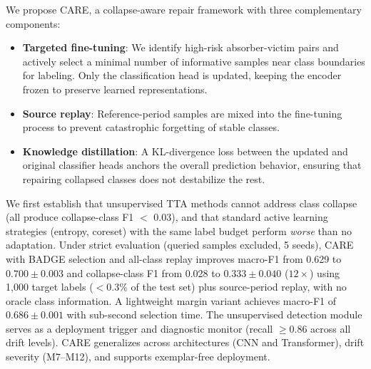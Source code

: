 \documentclass[journal]{IEEEtran}
\newcommand{\ours}{CARE}  %
\begin{document}
We propose \ours{}, a collapse-aware repair framework with three complementary components:
\begin{itemize}
  \item \textbf{Targeted fine-tuning}: We identify high-risk absorber-victim pairs and actively select a minimal number of informative samples near class boundaries for labeling. Only the classification head is updated, keeping the encoder frozen to preserve learned representations.
  \item \textbf{Source replay}: Reference-period samples are mixed into the fine-tuning process to prevent catastrophic forgetting of stable classes.
  \item \textbf{Knowledge distillation}: A KL-divergence loss between the updated and original classifier heads anchors the overall prediction behavior, ensuring that repairing collapsed classes does not destabilize the rest.
\end{itemize}

We first establish that unsupervised TTA methods cannot address class collapse (all produce collapse-class F1 $<$ 0.03), and that standard active learning strategies (entropy, coreset) with the same label budget perform \textit{worse} than no adaptation.
Under strict evaluation (queried samples excluded, 5 seeds), \ours{} with BADGE selection and all-class replay improves macro-F1 from 0.629 to $0.700{\pm}0.003$ and collapse-class F1 from 0.028 to $0.333{\pm}0.040$ ($12\times$) using 1{,}000 target labels ($<$0.3\% of the test set) plus source-period replay, with no oracle class information.
A lightweight margin variant achieves macro-F1 of $0.686{\pm}0.001$ with sub-second selection time.
The unsupervised detection module serves as a deployment trigger and diagnostic monitor (recall $\geq$0.86 across all drift levels).
\ours{} generalizes across architectures (CNN and Transformer), drift severity (M7--M12), and supports exemplar-free deployment.
\end{document}
